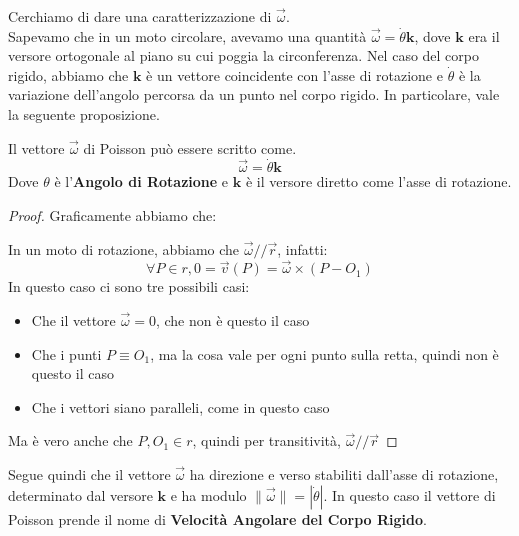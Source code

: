 \documentclass[11pt,a4paper,twoside]{article}
\theoremstyle{definition}
\begin{document}
Cerchiamo di dare una caratterizzazione di $\vec \omega$.\\
Sapevamo che in un moto circolare, avevamo una quantità $\vec \omega = \dot \theta \mathbf k$, dove $\mathbf k$ era il versore ortogonale al piano su cui poggia la circonferenza. Nel caso del corpo rigido, abbiamo che $\mathbf k$ è un vettore coincidente con l'asse di rotazione e $\dot \theta$ è la variazione dell'angolo percorsa da un punto nel corpo rigido. In particolare, vale la seguente proposizione.

\begin{prop}{}{}
	Il vettore $\vec \omega$ di Poisson può essere scritto come.
	\[ \vec \omega = \dot \theta \mathbf k \]
	Dove $\theta$ è l'\textbf{Angolo di Rotazione} e $\mathbf{k}$ è il versore diretto come l'asse di rotazione.
\end{prop}

\begin{proof}
	Graficamente abbiamo che:
	\begin{center}
	\end{center}
	In un moto di rotazione, abbiamo che $\vec \omega /\!/ \vec r$, infatti:
	\[ \forall P \in r, 0 = \vec v(P) = \vec \omega \times (P-O_1) \]
	In questo caso ci sono tre possibili casi:
	\begin{itemize}
		\item Che il vettore $\vec \omega = 0$, che non è questo il caso
		\item Che i punti $P\equiv O_1$, ma la cosa vale per ogni punto sulla retta, quindi non è questo il caso
		\item Che i vettori siano paralleli, come in questo caso
	\end{itemize}
	Ma è vero anche che $P, O_1 \in r$, quindi per transitività, $\vec \omega /\!/ \vec r$
\end{proof}

Segue quindi che il vettore $\vec \omega$ ha direzione e verso stabiliti dall'asse di rotazione, determinato dal versore $\mathbf k$ e ha modulo $\|\vec \omega\| = |\dot \theta|$. In questo caso il vettore di Poisson prende il nome di \textbf{Velocità Angolare del Corpo Rigido}.
\end{document}
